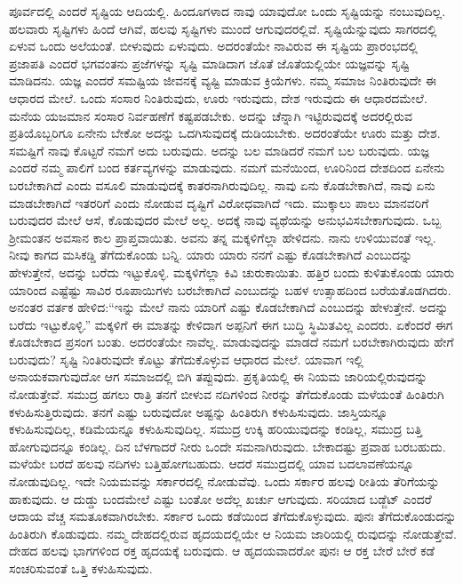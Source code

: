 ಪೂರ್ವದಲ್ಲಿ ಎಂದರೆ ಸೃಷ್ಟಿಯ ಆದಿಯಲ್ಲಿ. ಹಿಂದೂಗಳಾದ ನಾವು ಯಾವುದೋ ಒಂದು ಸೃಷ್ಟಿಯನ್ನು ನಂಬುವುದಿಲ್ಲ. ಹಲವಾರು ಸೃಷ್ಟಿಗಳು ಹಿಂದೆ ಆಗಿವೆ, ಹಲವು ಸೃಷ್ಟಿಗಳು ಮುಂದೆ ಆಗುವುದರಲ್ಲಿವೆ. ಸೃಷ್ಟಿಯೆನ್ನುವುದು ಸಾಗರದಲ್ಲಿ ಏಳುವ ಒಂದು ಅಲೆಯಂತೆ. ಬೀಳುವುದು ಏಳುವುದು. ಅದರಂತೆಯೇ ನಾವಿರುವ ಈ ಸೃಷ್ಟಿಯ ಪ್ರಾರಂಭದಲ್ಲಿ ಪ್ರಜಾಪತಿ ಎಂದರೆ ಭಗವಂತನು ಪ್ರಜೆಗಳನ್ನು ಸೃಷ್ಟಿ ಮಾಡಿದಾಗ ಜೊತೆ ಜೊತೆಯಲ್ಲಿಯೇ ಯಜ್ಞವನ್ನು ಸೃಷ್ಟಿ ಮಾಡಿದನು. ಯಜ್ಞ ಎಂದರೆ ಸಮಷ್ಟಿಯ ಜೀವನಕ್ಕೆ ವ್ಯಷ್ಟಿ ಮಾಡುವ ಕ್ರಿಯೆಗಳು. ನಮ್ಮ ಸಮಾಜ ನಿಂತಿರುವುದೇ ಈ ಆಧಾರದ ಮೇಲೆ. ಒಂದು ಸಂಸಾರ ನಿಂತಿರುವುದು, ಊರು ಇರುವುದು, ದೇಶ ಇರುವುದು ಈ ಆಧಾರದಮೇಲೆ. ಮನೆಯ ಯಜಮಾನ ಸಂಸಾರ ನಿರ್ವಹಣೆಗೆ ಕಷ್ಟಪಡಬೇಕು. ಅದನ್ನು ಚೆನ್ನಾಗಿ ಇಟ್ಟಿರುವುದಕ್ಕೆ ಅದರಲ್ಲಿರುವ ಪ್ರತಿಯೊಬ್ಬರಿಗೂ ಏನೇನು ಬೇಕೋ ಅದನ್ನು ಒದಗಿಸುವುದಕ್ಕೆ ದುಡಿಯಬೇಕು. ಅದರಂತೆಯೇ ಊರು ಮತ್ತು ದೇಶ. ಸಮಷ್ಟಿಗೆ ನಾವು ಕೊಟ್ಟರೆ ನಮಗೆ ಅದು ಬರುವುದು. ಅದನ್ನು ಬಲ ಮಾಡಿದರೆ ನಮಗೆ ಬಲ ಬರುವುದು. ಯಜ್ಞ ಎಂದರೆ ನಮ್ಮ ಪಾಲಿಗೆ ಬಂದ ಕರ್ತವ್ಯಗಳನ್ನು ಮಾಡುವುದು. ನಮಗೆ ಮನೆಯಿಂದ, ಊರಿನಿಂದ ದೇಶದಿಂದ ಏನೇನು ಬರಬೇಕಾಗಿದೆ ಎಂದು ವಸೂಲಿ ಮಾಡುವುದಕ್ಕೆ ಕಾತರನಾಗಿರುವುದಿಲ್ಲ. ನಾವು ಏನು ಕೊಡಬೇಕಾಗಿದೆ, ನಾವು ಏನು ಮಾಡಬೇಕಾಗಿದೆ ಇತರರಿಗೆ ಎಂದು ನೋಡುವ ದೃಷ್ಟಿಗೆ ವಿರೋಧವಾಗಿದೆ ಇದು. ಮುಕ್ಕಾಲು ಪಾಲು ಮಾನವರಿಗೆ ಬರುವುದರ ಮೇಲೆ ಆಸೆ, ಕೊಡುವುದರ ಮೇಲೆ ಅಲ್ಲ. ಅದಕ್ಕೆ ನಾವು ವ್ಯಥೆಯನ್ನು ಅನುಭವಿಸಬೇಕಾಗುವುದು. ಒಬ್ಬ ಶ‍್ರೀಮಂತನ ಅವಸಾನ ಕಾಲ ಪ್ರಾಪ್ತವಾಯಿತು. ಅವನು ತನ್ನ ಮಕ್ಕಳಿಗೆಲ್ಲಾ ಹೇಳಿದನು. ನಾನು ಉಳಿಯುವಂತೆ ಇಲ್ಲ. ನೀವು ಕಾಗದ ಮಸಿಕಡ್ಡಿ ತೆಗೆದುಕೊಂಡು ಬನ್ನಿ. ಯಾರು ಯಾರು ನನಗೆ ಎಷ್ಟು ಕೊಡಬೇಕಾಗಿದೆ ಎಂಬುದನ್ನು ಹೇಳುತ್ತೇನೆ, ಅದನ್ನು ಬರೆದು ಇಟ್ಟುಕೊಳ್ಳಿ. ಮಕ್ಕಳಿಗೆಲ್ಲಾ ಕಿವಿ ಚುರುಕಾಯಿತು. ಹತ್ತಿರ ಬಂದು ಕುಳಿತುಕೊಂಡು ಯಾರು ಯಾರಿಂದ ಎಷ್ಟೆಷ್ಟು ಸಾವಿರ ರೂಪಾಯಿಗಳು ಬರಬೇಕಾಗಿದೆ ಎಂಬುದನ್ನು ಬಹಳ ಉತ್ಸಾಹದಿಂದ ಬರೆಯತೊಡಗಿದರು. ಅನಂತರ ವರ್ತಕ ಹೇಳಿದ:“ಇನ್ನು ಮೇಲೆ ನಾನು ಯಾರಿಗೆ ಎಷ್ಟು ಕೊಡಬೇಕಾಗಿದೆ ಎಂಬುದನ್ನು ಹೇಳುತ್ತೇನೆ. ಅದನ್ನು ಬರೆದು ಇಟ್ಟುಕೊಳ್ಳಿ.” ಮಕ್ಕಳಿಗೆ ಈ ಮಾತನ್ನು ಕೇಳಿದಾಗ ಅಪ್ಪನಿಗೆ ಈಗ ಬುದ್ಧಿ ಸ್ಥಿಮಿತವಿಲ್ಲ ಎಂದರು. ಏಕೆಂದರೆ ಈಗ ಕೊಡಬೇಕಾದ ಪ್ರಸಂಗ ಬಂತು. ಅದರಂತೆಯೇ ನಾವೆಲ್ಲ. ಮಾಡುವುದನ್ನು ಮಾಡದೆ ನಮಗೆ ಬರಬೇಕಾಗಿರುವುದು ಹೇಗೆ ಬರುವುದು? ಸೃಷ್ಟಿ ನಿಂತಿರುವುದೇ ಕೊಟ್ಟು ತೆಗೆದುಕೊಳ್ಳುವ ಆಧಾರದ ಮೇಲೆ. ಯಾವಾಗ ಇಲ್ಲಿ ಅನಾಯಕವಾಗುವುದೋ ಆಗ ಸಮಾಜದಲ್ಲಿ ಬಿಗಿ ತಪ್ಪುವುದು. ಪ್ರಕೃತಿಯಲ್ಲಿ ಈ ನಿಯಮ ಜಾರಿಯಲ್ಲಿರುವುದನ್ನು ನೋಡುತ್ತೇವೆ. ಸಮುದ್ರ ಹಗಲು ರಾತ್ರಿ ತನಗೆ ಬೀಳುವ ನದಿಗಳಿಂದ ನೀರನ್ನು ತೆಗೆದುಕೊಂಡು ಮಳೆಯಂತೆ ಹಿಂತಿರುಗಿ ಕಳುಹಿಸುತ್ತಿರುವುದು. ತನಗೆ ಎಷ್ಟು ಬರುವುದೋ ಅಷ್ಟನ್ನು ಹಿಂತಿರುಗಿ ಕಳುಹಿಸುವುದು. ಜಾಸ್ತಿಯನ್ನೂ ಕಳುಹಿಸುವುದಿಲ್ಲ, ಕಡಿಮೆಯನ್ನೂ ಕಳುಹಿಸುವುದಿಲ್ಲ. ಸಮುದ್ರ ಉಕ್ಕಿ ಹರಿಯುವುದನ್ನು ಕಂಡಿಲ್ಲ, ಸಮುದ್ರ ಬತ್ತಿ ಹೋಗುವುದನ್ನೂ ಕಂಡಿಲ್ಲ. ದಿನ ಬೆಳಗಾದರೆ ನೀರು ಒಂದೇ ಸಮನಾಗಿರುವುದು. ಬೇಕಾದಷ್ಟು ಪ್ರವಾಹ ಬರಬಹುದು. ಮಳೆಯೇ ಬರದೆ ಹಲವು ನದಿಗಳು ಬತ್ತಿಹೋಗಬಹುದು. ಆದರೆ ಸಮುದ್ರದಲ್ಲಿ ಯಾವ ಬದಲಾವಣೆಯನ್ನೂ ನೋಡುವುದಿಲ್ಲ. ಇದೇ ನಿಯಮವನ್ನು ಸರ್ಕಾರದಲ್ಲಿ ನೋಡುವೆವು. ಒಂದು ಸರ್ಕಾರ ಹಲವು ರೀತಿಯ ತೆರಿಗೆಯನ್ನು ಹಾಕುವುದು. ಆ ದುಡ್ಡು ಬಂದಮೇಲೆ ಎಷ್ಟು ಬಂತೋ ಅದೆಲ್ಲ ಖರ್ಚು ಆಗುವುದು. ಸರಿಯಾದ ಬಡ್ಜೆಟ್ ಎಂದರೆ ಆದಾಯ ವೆಚ್ಚ ಸಮತೂಕವಾಗಿರಬೇಕು. ಸರ್ಕಾರ ಒಂದು ಕಡೆಯಿಂದ ತೆಗೆದುಕೊಳ್ಳುವುದು. ಪುನಃ ತೆಗೆದುಕೊಂಡುದನ್ನು ಹಿಂತಿರುಗಿ ಕೊಡುವುದು. ನಮ್ಮ ದೇಹದಲ್ಲಿರುವ ಹೃದಯದಲ್ಲಿಯೇ ಆ ನಿಯಮ ಜಾರಿಯಲ್ಲಿ ರುವುದನ್ನು ನೋಡುತ್ತೇವೆ. ದೇಹದ ಹಲವು ಭಾಗಗಳಿಂದ ರಕ್ತ ಹೃದಯಕ್ಕೆ ಬರುವುದು. ಆ ಹೃದಯವಾದರೋ ಪುನಃ ಆ ರಕ್ತ ಬೇರೆ ಬೇರೆ ಕಡೆ ಸಂಚರಿಸುವಂತೆ ಒತ್ತಿ ಕಳುಹಿಸುವುದು.

